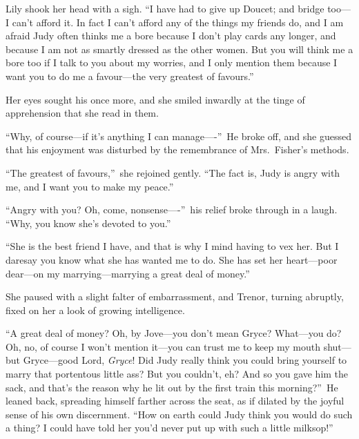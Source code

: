 \documentclass[12pt,a4paper]{book}
\begin{document}
Lily shook her head with a sigh. ``I have had to give up Doucet;
and bridge too---I can't afford it. In fact I can't afford any of
the things my friends do, and I am afraid Judy often thinks me a
bore because I don't play cards any longer, and because I am not
as smartly dressed as the other women. But you will think me a
bore too if I talk to you about my worries, and I only mention
them because I want you to do me a favour---the very greatest of
favours.''





Her eyes sought his once more, and she smiled inwardly at the
tinge of apprehension that she read in them.





``Why, of course---if it's anything I can manage----''\ He broke off,
and she guessed that his enjoyment was disturbed by the
remembrance of Mrs.\ Fisher's methods.





``The greatest of favours,''\ she rejoined gently. ``The fact is,
Judy is angry with me, and I want you to make my peace.''





``Angry with you? Oh, come, nonsense----''\ his relief broke through
in a laugh. ``Why, you know she's devoted to you.''





``She is the best friend I have, and that is why I mind having to
vex her. But I daresay you know what she has wanted me to do. She
has set her heart---poor dear---on my marrying---marrying a great
deal of money.''





She paused with a slight falter of embarrassment, and Trenor,
turning abruptly, fixed on her a look of growing intelligence.





``A great deal of money? Oh, by Jove---you don't mean Gryce? 
What---you do? Oh, no, of course I won't mention it---you can trust
me to keep my mouth shut---but Gryce---good Lord, \textit{Gryce}! Did
Judy really think you could bring yourself to marry that
portentous little ass? But you couldn't, eh? And so you gave him
the sack, and that's the reason why he lit out by the first train
this morning?''\ He leaned back, spreading himself farther across
the seat, as if dilated by the joyful sense of his own
discernment. ``How on earth could Judy think you would do such a
thing? I could have told her you'd never put up with such a
little milksop!''
\end{document}
